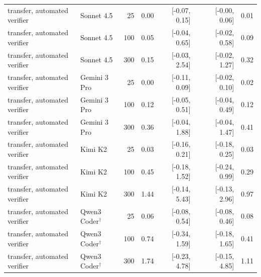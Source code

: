 \begin{table}[t]
\begin{tabular}{llrrrrrr}
transfer, automated verifier & Sonnet 4.5 & 25 & 0.00 & [-0.07, 0.15] &  & [-0.00, 0.06] & 0.01 \\
transfer, automated verifier & Sonnet 4.5 & 100 & 0.05 & [-0.04, 0.65] &  & [-0.02, 0.58] & 0.09 \\
transfer, automated verifier & Sonnet 4.5 & 300 & 0.15 & [-0.03, 2.54] &  & [-0.02, 1.27] & 0.32 \\
transfer, automated verifier & Gemini 3 Pro & 25 & 0.00 & [-0.11, 0.09] &  & [-0.02, 0.10] & 0.02 \\
transfer, automated verifier & Gemini 3 Pro & 100 & 0.12 & [-0.05, 0.51] &  & [-0.04, 0.49] & 0.12 \\
transfer, automated verifier & Gemini 3 Pro & 300 & 0.36 & [-0.04, 1.88] &  & [-0.04, 1.47] & 0.41 \\
transfer, automated verifier & Kimi K2 & 25 & 0.03 & [-0.16, 0.21] &  & [-0.18, 0.25] & 0.03 \\
transfer, automated verifier & Kimi K2 & 100 & 0.45 & [-0.18, 1.52] &  & [-0.24, 0.99] & 0.29 \\
transfer, automated verifier & Kimi K2 & 300 & 1.44 & [-0.14, 5.43] &  & [-0.13, 2.96] & 0.97 \\
transfer, automated verifier & Qwen3 Coder$^\dagger$ & 25 & 0.06 & [-0.08, 0.54] &  & [-0.08, 0.46] & 0.08 \\
transfer, automated verifier & Qwen3 Coder$^\dagger$ & 100 & 0.74 & [-0.34, 1.59] &  & [-0.18, 1.65] & 0.41 \\
transfer, automated verifier & Qwen3 Coder$^\dagger$ & 300 & 1.74 & [-0.23, 4.78] &  & [-0.15, 4.85] & 1.11 \\
\bottomrule
\end{tabular}
\end{table}
